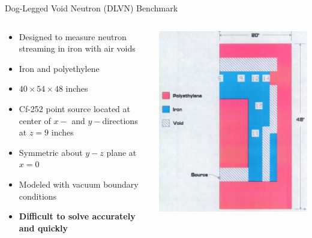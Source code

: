 \documentclass{beamer}
\begin{document}
\begin{frame}{Dog-Legged Void Neutron (DLVN) Benchmark}
%
\begin{columns}
\begin{column}{0.5\textwidth}
\begin{itemize}
\item{Designed to measure neutron streaming in iron with air voids}
\item{Iron and polyethylene}
\item{$40\times54\times48$ inches}
\item{Cf-252 point source located at center of $x-$ and $y-$directions at $z = 9$ inches}
\item{Symmetric about $y-z$ plane at $x = 0$}
\item{Modeled with vacuum boundary conditions}
\item{\textbf{Difficult to solve accurately and quickly}}
\end{itemize}
\end{column}
%
\begin{column}{0.5\textwidth}
\includegraphics[width=\textwidth,natwidth=530,natheight=647]{img/dlvn.png}
\end{column}
\end{columns}

%
\end{frame}
\end{document}
